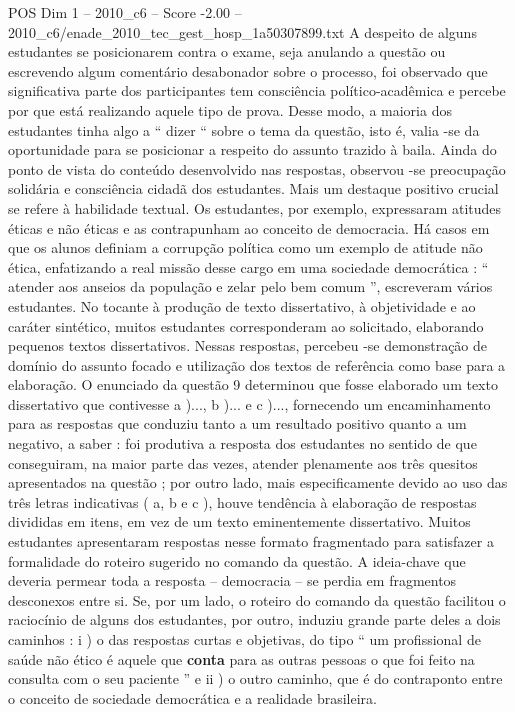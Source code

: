 \begin{textsample}{POS Dim 1 – 2010\_c6 – Score -2.00 – 2010\_c6/enade\_2010\_tec\_gest\_hosp\_1a50307899.txt}
A despeito de alguns estudantes se posicionarem contra o exame, seja anulando a questão ou escrevendo algum comentário desabonador sobre o processo, foi observado que significativa parte dos participantes tem consciência político-acadêmica e percebe por que está realizando aquele tipo de prova.
Desse modo, a maioria dos estudantes tinha algo a “ dizer “ sobre o tema da questão, isto é, valia -se da oportunidade para se posicionar a respeito do assunto trazido à baila.
Ainda do ponto de vista do conteúdo desenvolvido nas respostas, observou -se preocupação solidária e consciência cidadã dos estudantes.
Mais um destaque positivo crucial se refere à habilidade textual.
Os estudantes, por exemplo, expressaram atitudes éticas e não éticas e as contrapunham ao conceito de democracia.
Há casos em que os alunos definiam a corrupção política como um exemplo de atitude não ética, enfatizando a real missão desse cargo em uma sociedade democrática : “ atender aos anseios da população e zelar pelo bem comum ”, escreveram vários estudantes.
No tocante à produção de texto dissertativo, à objetividade e ao caráter sintético, muitos estudantes corresponderam ao solicitado, elaborando pequenos textos dissertativos.
Nessas respostas, percebeu -se demonstração de domínio do assunto focado e utilização dos textos de referência como base para a elaboração.
O enunciado da questão 9 determinou que fosse elaborado um texto dissertativo que contivesse a )..., b )... e c )..., fornecendo um encaminhamento para as respostas que conduziu tanto a um resultado positivo quanto a um negativo, a saber : foi produtiva a resposta dos estudantes no sentido de que conseguiram, na maior parte das vezes, atender plenamente aos três quesitos apresentados na questão ; por outro lado, mais especificamente devido ao uso das três letras indicativas ( a, b e c ), houve tendência à elaboração de respostas divididas em itens, em vez de um texto eminentemente dissertativo.
Muitos estudantes apresentaram respostas nesse formato fragmentado para satisfazer a formalidade do roteiro sugerido no comando da questão.
A ideia-chave que deveria permear toda a resposta – democracia – se perdia em fragmentos desconexos entre si.
Se, por um lado, o roteiro do comando da questão facilitou o raciocínio de alguns dos estudantes, por outro, induziu grande parte deles a dois caminhos : i ) o das respostas curtas e objetivas, do tipo “ um profissional de saúde não ético é aquele que \textbf{conta} para as outras pessoas o que foi feito na consulta com o seu paciente ” e ii ) o outro caminho, que é do contraponto entre o conceito de sociedade democrática e a realidade brasileira.

\end{textsample}
